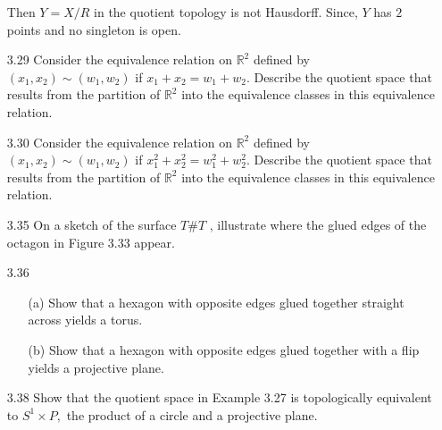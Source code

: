 \documentclass[12pt]{article}
\begin{document}
\begin{enumerate}
	Then $ Y = X/R $ in the quotient topology is not Hausdorff. Since, $ Y $ has $ 2 $ points and no singleton is open.

	\item[3.29] Consider the equivalence relation on $\mathbb { R } ^ { 2 }$ defined by $\left( x _ { 1 } , x _ { 2 } \right) \sim \left( w _ { 1 } , w _ { 2 } \right)$ if $x _ { 1 } + x _ { 2 } = w _ { 1 } + w _ { 2 } .$ Describe the quotient space that results from the partition of $\mathbb { R } ^ { 2 }$ into the equivalence classes in this equivalence relation.

	\item[3.30] Consider the equivalence relation on $\mathbb { R } ^ { 2 }$ defined by $\left( x _ { 1 } , x _ { 2 } \right) \sim \left( w _ { 1 } , w _ { 2 } \right)$ if $x _ { 1 } ^ { 2 } + x _ { 2 } ^ { 2 } = w _ { 1 } ^ { 2 } + w _ { 2 } ^ { 2 } .$ Describe the quotient space that results from the partition of $\mathbb { R } ^ { 2 }$ into the equivalence classes in this equivalence relation.

	\item[3.35] On a sketch of the surface $T \# T$ , illustrate where the glued edges of the octagon in Figure 3.33 appear.

	\item[3.36] \begin{enumerate}
		\item[(a)] Show that a hexagon with opposite edges glued together straight across yields a torus.
			
		\item[(b)]Show that a hexagon with opposite edges glued together with a flip yields	a projective plane.
		
	\end{enumerate}
	
	\item[3.38] Show that the quotient space in Example 3.27 is topologically equivalent to
	$S ^ { 1 } \times P ,$ the product of a circle and a projective plane.

\end{enumerate}
 
\end{document}
